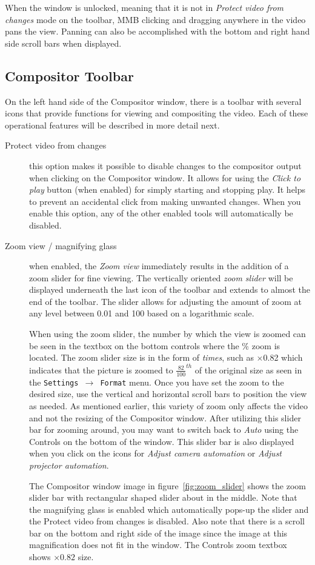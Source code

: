 When the window is unlocked, meaning that it is not in \textit{Protect video from changes} mode on the
toolbar, MMB clicking and dragging anywhere in the video pans the view.  Panning can also
be accomplished with the bottom and right hand side scroll bars when displayed.

\subsection{Compositor Toolbar}%
\label{sub:compositor_toolbar}

On the left hand side of the Compositor window, there is a toolbar with several icons that
provide functions for viewing and compositing the video. Each of these operational features 
will be described in more detail next. 
\begin{description}
    \item[Protect video from changes] this option makes it possible to disable changes to the
compositor output when clicking on the Compositor window. It allows for using the
\textit{Click to play} button (when enabled) for simply starting and stopping play.  It helps
to prevent an accidental click from making unwanted changes. When you enable this option, any
of the other enabled tools will automatically be disabled.

     \item[Zoom view / magnifying glass] when enabled, the \textit{Zoom view} immediately results
in the addition of a zoom slider for fine viewing.  
The vertically oriented \textit{zoom slider} will be displayed underneath the last icon of the toolbar and extends
to almost the end of the toolbar.
The slider allows for adjusting the amount of zoom at any level between 0.01 and 100 based on a logarithmic scale.  

When using the zoom slider, the number by which the view is zoomed can be seen in the textbox 
on the bottom controls where the \% zoom is located.  
The zoom slider size is in the form of \textit{times}, such as $\times$0.82 which indicates that the picture is zoomed to $\frac{82}{100}^{th}$ of the original size as seen in the \texttt{Settings $\rightarrow$ Format} menu.  
Once you have set the zoom to the desired size, use the vertical and horizontal scroll bars to position the view as needed.
As mentioned earlier, this
variety of zoom only affects the video and not the resizing of the Compositor window.  After
utilizing this slider bar for zooming around, you may want to switch back to \textit{Auto} 
using the Controls on the bottom of the window.
This slider bar is also displayed
when you click on the icons for \textit{Adjust camera automation} or \textit{Adjust projector automation}.  

The Compositor window image in figure~\ref{fig:zoom_slider} shows the zoom slider bar with rectangular shaped slider about in the middle.  Note that the magnifying glass is enabled which
automatically pops-up the slider and the Protect video from changes is disabled.  Also note that
there is a scroll bar on the bottom and right side of the image since the image at this magnification
does not fit in the window.
The Controls zoom textbox shows $\times0.82$ size.  
\end{description}

